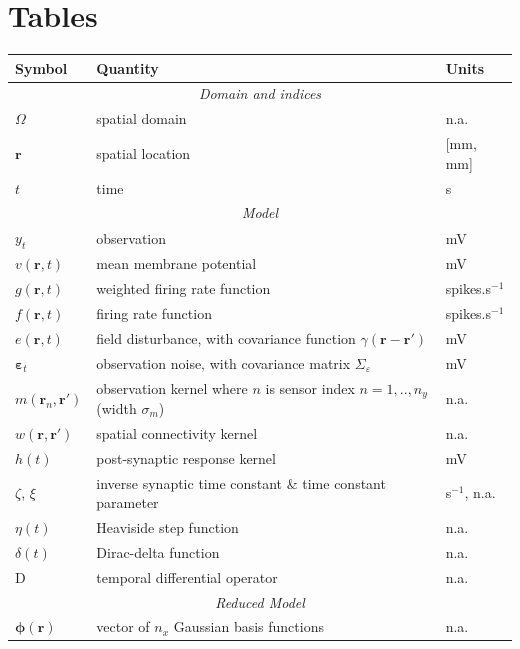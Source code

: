 \documentclass[review,authoryear,3p]{elsarticle}
\begin{document}
 


\clearpage
\newpage
\section*{Tables}

\singlespacing

\begin{table}[!ht]
\begin{tabular}{|l|l|l|}
	\hline
	\textbf{Symbol} & \textbf{Quantity} & \textbf{Units}\\
	\hline
	\multicolumn{3}{|c|}{\emph{Domain and indices}}\\
	\hline
	$\Omega$ & spatial domain & n.a.\\
	$\mathbf{r}$ & spatial location & [mm, mm]\\
	$t$ & time & s\\
	\hline
	\multicolumn{3}{|c|}{\emph{Model}}\\
	\hline
    $y_t$ & observation & mV\\
    $v(\mathbf{r},t)$ & mean membrane potential & mV \\
	$g(\mathbf{r},t)$ & weighted firing rate function & spikes.s$^{-1}$\\
	$f(\mathbf{r},t)$ & firing rate function & spikes.s$^{-1}$\\
	$e(\mathbf{r},t)$ & field disturbance, with covariance function $\gamma(\mathbf r-\mathbf r')$ & mV\\
	$\boldsymbol\varepsilon_t$ & observation noise, with covariance matrix $\Sigma_\varepsilon$ & mV\\
	$m(\mathbf{r}_n,\mathbf{r}')$ & observation kernel where $n$ is sensor index $n=1,..,n_y$ (width $\sigma_m$) & n.a. \\
	$w(\mathbf{r},\mathbf{r}')$ & spatial connectivity kernel & n.a.\\
	$h(t)$ & post-synaptic response kernel & mV\\
	$\zeta$, $\xi$ & inverse synaptic time constant \& time constant parameter & s$^{-1}$, n.a.\\
	$\eta(t)$ & Heaviside step function & n.a.\\
	$\delta(t)$ & Dirac-delta function & n.a.\\
	$\textrm{D}$ & temporal differential operator & n.a.\\
	\hline
	\multicolumn{3}{|c|}{\emph{Reduced Model}} \\
	\hline
   	$\boldsymbol\phi(\mathbf{r})$ & vector of $n_x$ Gaussian basis functions & n.a.\\

\end{tabular}
\end{table}
\end{document}
